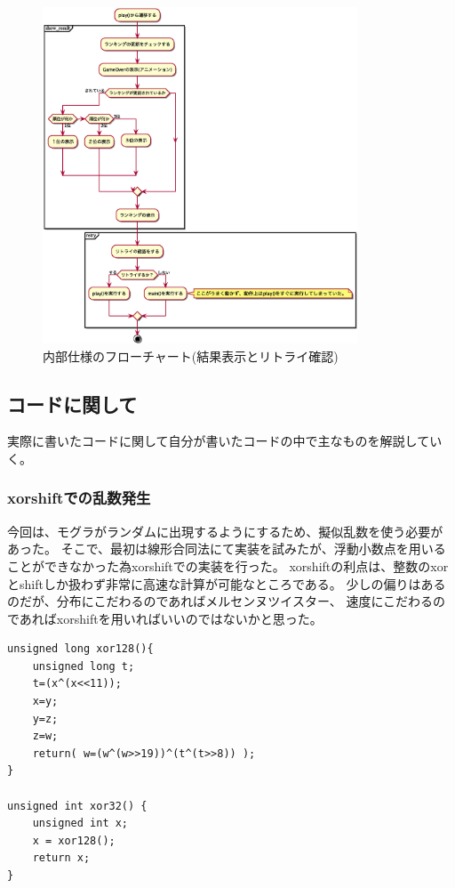 \documentclass[11pt,a4j]{jsarticle}
\makeatletter
\newcommand{\figcaption}[1]{\def\@captype{figure}\caption{#1}}
\makeatother
\begin{document}
\begin{figure}[H]
  \centering
  \includegraphics[height=100mm]{img/mogura_result.eps}
  \figcaption{内部仕様のフローチャート(結果表示とリトライ確認)}
  \label{fig:flow3}
\end{figure}

\subsection{コードに関して}
\label{sub:コードに関して}

実際に書いたコードに関して自分が書いたコードの中で主なものを解説していく。

\subsubsection{xorshiftでの乱数発生}
\label{subs:xorshiftでの乱数発生}

今回は、モグラがランダムに出現するようにするため、擬似乱数を使う必要があった。
そこで、最初は線形合同法にて実装を試みたが、浮動小数点を用いることができなかった為xorshiftでの実装を行った。
xorshiftの利点は、整数のxorとshiftしか扱わず非常に高速な計算が可能なところである。
少しの偏りはあるのだが、分布にこだわるのであればメルセンヌツイスター、
速度にこだわるのであればxorshiftを用いればいいのではないかと思った。

\begin{lstlisting}[basicstyle=\ttfamily\footnotesize, frame=single]
unsigned long xor128(){
	unsigned long t;
	t=(x^(x<<11));
	x=y;
	y=z;
	z=w;
	return( w=(w^(w>>19))^(t^(t>>8)) );
}

unsigned int xor32() {
	unsigned int x;
	x = xor128();
	return x;
}
\end{lstlisting}
\end{document}
